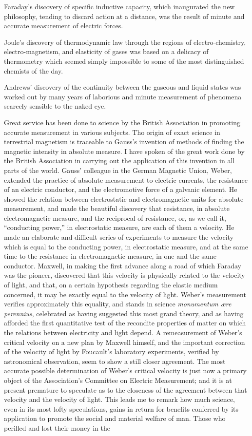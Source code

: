 \documentclass[a4paper, 11pt, oneside, english]{article}
\begin{document}
Faraday's discovery of specific inductive capacity, which inaugurated the new philosophy, tending to discard action at a distance, was the result of minute and accurate measurement of electric forces.

Joule's discovery of thermodynamic law through the regions of electro-chemistry, electro-magnetism, and elasticity of gases was based on a delicacy of thermometry which seemed simply impossible to some of the most distinguished chemists of the day.

Andrews' discovery of the continuity between the gaseous and liquid states was worked out by many years of laborious and minute measurement of phenomena scarcely sensible to the naked eye.

Great service has been done to science by the British Association in promoting accurate measurement in various subjects. Tho origin of exact science in terrestrial magnetism is traceable to Gauss's invention of methods of finding the magnetic intensity in absolute measure. I have spoken of the great work done by the British Association in carrying out the application of this invention in all parts of the world. Gauss' colleague in the German Magnetic Union, Weber, extended the practice of absolute measurement to electric currents, the resistance of an electric conductor, and the electromotive force of a galvanic element. He showed the relation between electrostatic and electromagnetic units for absolute measurement, and made the beautiful discovery that resistance, in absolute electromagnetic measure, and the reciprocal of resistance, or, as we call it, ``conducting power,'' in electrostatic measure, are each of them a velocity. He made an elaborate and difficult series of experiments to measure the velocity which is equal to the conducting power, in electrostatic measure, and at the same time to the resistance in electromagnetic measure, in one and the same conductor. Maxwell, in making the first advance along a road of which Faraday was the pioneer, discovered that this velocity is physically related to the velocity of light, and that, on a certain hypothesis regarding the elastic medium concerned, it may be exactly equal to the velocity of light. Weber's measurement verifies approximately this equality, and stands in science \emph{monumentum ære perennius}, celebrated as having suggested this most grand theory, and as having afforded the first quantitative test of the recondite properties of matter on which the relations between electricity and light depend. A remeasurement of Weber's critical velocity on a new plan by Maxwell himself, and the important correction of the velocity of light by Foucault's laboratory experiments, verified by astronomical observation, seem to show a still closer agreement. The most accurate possible determination of Weber's critical velocity is just now a primary object of the Association's Committee on Electric Measurement; and it is at present premature to speculate as to the closeness of the agreement between that velocity and the velocity of light. This leads me to remark how much science, even in its most lofty speculations, gains in return for benefits conferred by its application to promote the social and material welfare of man. Those who perilled and lost their money in the 
\end{document}
